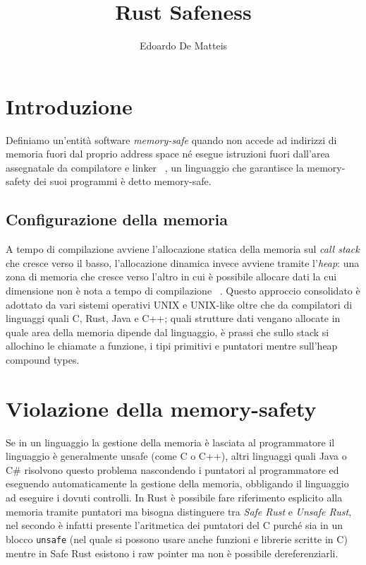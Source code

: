 \documentclass{article}
\title{Rust Safeness}
\author{Edoardo De Matteis}
\begin{document}
\maketitle
\tableofcontents

\clearpage 

\section{Introduzione}
Definiamo un'entità software \emph{memory-safe} quando non accede ad indirizzi di memoria fuori dal proprio address space né esegue istruzioni fuori dall'area assegnatale da compilatore e linker ~\cite{paper:def}, un linguaggio che garantisce la memory-safety dei suoi programmi è detto memory-safe.

\subsection{Configurazione della memoria}
A tempo di compilazione avviene l'allocazione statica della memoria sul \emph{call stack} che cresce verso il basso, l'allocazione dinamica invece avviene tramite l'\emph{heap}: una zona di memoria che cresce verso l'altro in cui è possibile allocare dati la cui dimensione non è nota a tempo di compilazione ~\cite{gollmann:computersecurity}. Questo approccio consolidato è adottato da vari sistemi operativi UNIX e UNIX-like oltre che da compilatori di linguaggi quali C, Rust, Java e C++; quali strutture dati vengano allocate in quale area della memoria dipende dal linguaggio, è prassi che sullo stack si allochino le chiamate a funzione, i tipi primitivi e puntatori mentre sull'heap compound types.

\section{Violazione della memory-safety}
Se in un linguaggio la gestione della memoria è lasciata al programmatore il linguaggio è generalmente unsafe (come C o C++), altri linguaggi quali Java o C\# risolvono questo problema nascondendo i puntatori al programmatore ed eseguendo automaticamente la gestione della memoria, obbligando il linguaggio ad eseguire i dovuti controlli. In Rust è possibile fare riferimento esplicito alla memoria tramite puntatori ma bisogna distinguere tra \emph{Safe Rust} e \emph{Unsafe Rust}, nel secondo è infatti presente l'aritmetica dei puntatori del C purché sia in un blocco \texttt{unsafe} (nel quale si possono usare anche funzioni e librerie scritte in C) mentre in Safe Rust esistono i raw pointer ma non è possibile dereferenziarli.  
\end{document}
